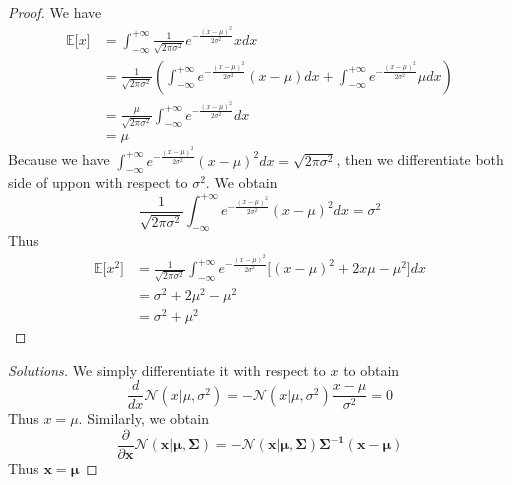 \documentclass[12pt, a4paper]{article}
\newcommand{\E}{\mathbb{E}}
\newenvironment{exercise}[2][Ex]{\begin{trivlist}
\item[\hskip \labelsep {\bfseries #1}\hskip \labelsep {\bfseries #2.}]}{\end{trivlist}}
\begin{document}
\begin{exercise}{1.8(**)}
    \begin{proof}
        We have
        \begin{align}
            \E\lbrack x\rbrack&=\int_{-\infty}^{+\infty}\frac{1}{\sqrt{2\pi\sigma^2}}
            e^{-\frac{(x-\mu)^2}{2\sigma^2}}xdx\nonumber\\
            &=\frac{1}{\sqrt{2\pi\sigma^2}}(\int_{-\infty}^{+\infty}e^{-\frac{(x-\mu)^2}
            {2\sigma^2}}(x-\mu)dx+\int_{-\infty}^{+\infty}e^{-\frac{(x-\mu)^2}{2\sigma^2}}
            \mu dx)\nonumber\\
            &=\frac{\mu}{\sqrt{2\pi\sigma^2}}\int_{-\infty}^{+\infty}e^{-\frac{(x-\mu)^2}
            {2\sigma^2}}dx\nonumber\\
            &=\mu
        \end{align}
        Because we have $\int_{-\infty}^{+\infty}e^{-\frac{(x-\mu)^2}{2\sigma^2}}(x-\mu)^2
        dx=\sqrt{2\pi\sigma^2}$, then we differentiate both side of uppon with respect to 
        $\sigma^2$. We obtain
        \begin{equation}
            \frac{1}{\sqrt{2\pi\sigma^2}}\int_{-\infty}^{+\infty}e^{-\frac{(x-\mu)^2}
            {2\sigma^2}}(x-\mu)^2dx=\sigma^2
        \end{equation}
        Thus
        \begin{align*}
            \E\lbrack x^2\rbrack&=
            \frac{1}{\sqrt{2\pi\sigma^2}}\int_{-\infty}^{+\infty}e^{-\frac{(x-\mu)^2}
            {2\sigma^2}}\lbrack(x-\mu)^2+2x\mu-\mu^2\rbrack dx\\
            &=\sigma^2+2\mu^2-\mu^2\\
            &=\sigma^2+\mu^2
        \end{align*}
    \end{proof}
\end{exercise}
\begin{exercise}{1.9(*)}
    \begin{proof}[Solutions]
        We simply differentiate it with respect to $x$ to obtain
        \begin{equation}
            \frac{d}{dx}\mathcal{N}(x|\mu,\sigma^2)=-\mathcal{N}(x|\mu,\sigma^2)\frac{x-\mu}
            {\sigma^2}=0
        \end{equation}
        Thus $x=\mu$. 
        Similarly, we obtain
        \begin{equation}
            \frac{\partial}{\partial\bm{x}}\mathcal{N}(\bm{x}|\bm{\mu},\bm{\Sigma})=
            -\mathcal{N}(\bm{x}|\bm{\mu},\bm{\Sigma})\bm{\Sigma^{-1}}(\bm{x}-\bm{\mu})
        \end{equation}
        Thus $\bm{x}=\bm{\mu}$
    \end{proof}
\end{exercise}
\end{document}

